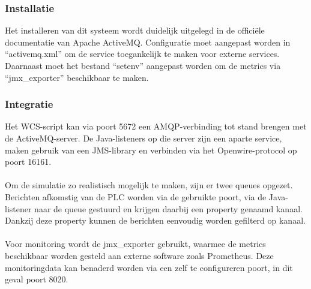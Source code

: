 \subsubsection{Installatie}
Het installeren van dit systeem wordt duidelijk uitgelegd in de officiële documentatie van Apache ActiveMQ.
Configuratie moet aangepast worden in ``activemq.xml'' om de service toegankelijk te maken voor externe services.
Daarnaast moet het bestand ``setenv'' aangepast worden om de metrics via ``jmx\_exporter'' beschikbaar te maken.

\subsubsection{Integratie}
Het WCS-script kan via poort 5672 een AMQP-verbinding tot stand brengen met de ActiveMQ-server.
De Java-listeners op die server zijn een aparte service, maken gebruik van een JMS-library en verbinden via het Openwire-protocol op poort 16161.
\\\\
Om de simulatie zo realistisch mogelijk te maken, zijn er twee queues opgezet. 
Berichten afkomstig van de PLC worden via de gebruikte poort, via de Java-listener naar de queue gestuurd en krijgen daarbij een property genaamd kanaal.
Dankzij deze property kunnen de berichten eenvoudig worden gefilterd op kanaal. 
\\\\
Voor monitoring wordt de jmx\_exporter gebruikt, waarmee de metrics beschikbaar worden gesteld aan externe software zoals Prometheus. 
Deze monitoringdata kan benaderd worden via een zelf te configureren poort, in dit geval poort 8020.

